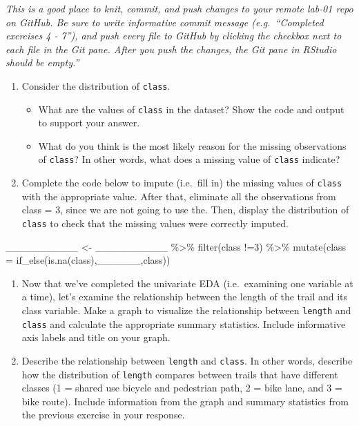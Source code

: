 \documentclass[
]{article}
\newenvironment{Shaded}{\begin{snugshade}}{\end{snugshade}}
\newcommand{\AttributeTok}[1]{\textcolor[rgb]{0.77,0.63,0.00}{#1}}
\newcommand{\DecValTok}[1]{\textcolor[rgb]{0.00,0.00,0.81}{#1}}
\newcommand{\FunctionTok}[1]{\textcolor[rgb]{0.00,0.00,0.00}{#1}}
\newcommand{\NormalTok}[1]{#1}
\newcommand{\OtherTok}[1]{\textcolor[rgb]{0.56,0.35,0.01}{#1}}
\newcommand{\SpecialCharTok}[1]{\textcolor[rgb]{0.00,0.00,0.00}{#1}}
\providecommand{\tightlist}{%
  \setlength{\itemsep}{0pt}\setlength{\parskip}{0pt}}
\begin{document}
\emph{This is a good place to knit, commit, and push changes to your
remote lab-01 repo on GitHub. Be sure to write informative commit
message (e.g.~``Completed exercises 4 - 7''), and push every file to
GitHub by clicking the checkbox next to each file in the Git pane. After
you push the changes, the Git pane in RStudio should be empty.''}

\begin{enumerate}
\def\labelenumi{\arabic{enumi}.}
\setcounter{enumi}{7}
\tightlist
\item
  Consider the distribution of \texttt{class}.

  \begin{itemize}
  \tightlist
  \item
    What are the values of \texttt{class} in the dataset? Show the code
    and output to support your answer.
  \item
    What do you think is the most likely reason for the missing
    observations of \texttt{class}? In other words, what does a missing
    value of \texttt{class} indicate?
  \end{itemize}
\item
  Complete the code below to impute (i.e.~fill in) the missing values of
  \texttt{class} with the appropriate value. After that, eliminate all
  the observations from class = 3, since we are not going to use the.
  Then, display the distribution of \texttt{class} to check that the
  missing values were correctly imputed.
\end{enumerate}

\begin{Shaded}
\begin{Highlighting}[]
\NormalTok{\_\_\_\_\_\_\_\_\_\_ }\OtherTok{\textless{}{-}}\NormalTok{ \_\_\_\_\_\_\_\_\_\_ }\SpecialCharTok{\%\textgreater{}\%} \FunctionTok{filter}\NormalTok{(class }\SpecialCharTok{!=}\DecValTok{3}\NormalTok{) }\SpecialCharTok{\%\textgreater{}\%} 
  \FunctionTok{mutate}\NormalTok{(}\AttributeTok{class =} \FunctionTok{if\_else}\NormalTok{(}\FunctionTok{is.na}\NormalTok{(class),\_\_\_\_\_\_,class)) }
\end{Highlighting}
\end{Shaded}

\begin{enumerate}
\def\labelenumi{\arabic{enumi}.}
\setcounter{enumi}{9}
\item
  Now that we've completed the univariate EDA (i.e.~examining one
  variable at a time), let's examine the relationship between the length
  of the trail and its class variable. Make a graph to visualize the
  relationship between \texttt{length} and \texttt{class} and calculate
  the appropriate summary statistics. Include informative axis labels
  and title on your graph.
\item
  Describe the relationship between \texttt{length} and \texttt{class}.
  In other words, describe how the distribution of \texttt{length}
  compares between trails that have different classes (1 = shared use
  bicycle and pedestrian path, 2 = bike lane, and 3 = bike route).
  Include information from the graph and summary statistics from the
  previous exercise in your response.
\end{enumerate}
\end{document}
